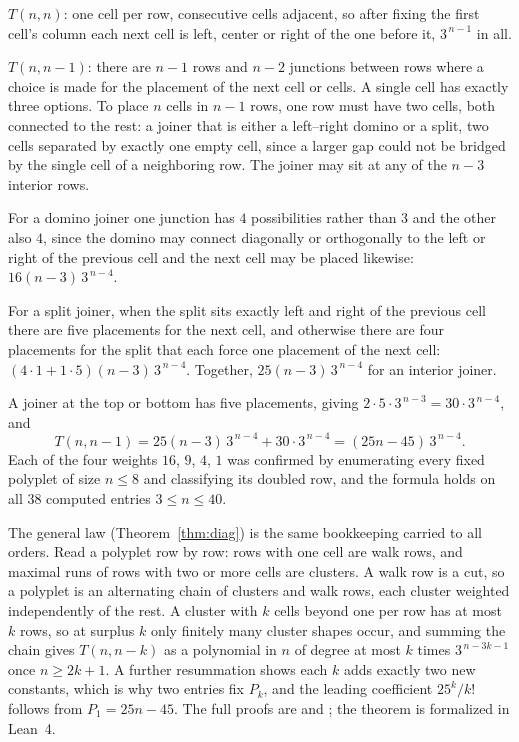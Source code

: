 \documentclass[11pt]{article}
\begin{document}
$T(n,n)$: one cell per row, consecutive cells adjacent, so after fixing the
first cell's column each next cell is left, center or right of the one
before it, $3^{\,n-1}$ in all.

$T(n,n-1)$: there are $n-1$ rows and $n-2$ junctions between rows where a
choice is made for the placement of the next cell or cells. A single cell has
exactly three options. To place $n$ cells in $n-1$ rows, one row must have
two cells, both connected to the rest: a joiner that is either a left--right
domino or a split, two cells separated by exactly one empty cell, since a
larger gap could not be bridged by the single cell of a neighboring row. The
joiner may sit at any of the $n-3$ interior rows.

For a domino joiner one
junction has $4$ possibilities rather than $3$ and the other also $4$, since
the domino may connect diagonally or orthogonally to the left or right of the
previous cell and the next cell may be placed likewise: $16(n-3)\,3^{\,n-4}$.

For a split joiner, when the split sits exactly left and right of the
previous cell there are five placements for the next cell, and otherwise
there are four placements for the split that each force one placement of the
next cell: $(4 \cdot 1 + 1 \cdot 5)(n-3)\,3^{\,n-4}$. Together, $25(n-3)\,
3^{\,n-4}$ for an interior joiner.

A joiner at the top or bottom has five placements, giving $2 \cdot 5 \cdot
3^{\,n-3} = 30 \cdot 3^{\,n-4}$, and
\[ T(n,n-1) = 25(n-3)\,3^{\,n-4} + 30 \cdot 3^{\,n-4} = (25n - 45)\,3^{\,n-4}. \]
Each of the four weights $16$, $9$, $4$, $1$ was confirmed by enumerating
every fixed polyplet of size $n \le 8$ and classifying its doubled row, and
the formula holds on all $38$ computed entries $3 \le n \le 40$.

The general law (Theorem~\ref{thm:diag}) is the same bookkeeping carried to
all orders. Read a polyplet row by row: rows with one cell are walk rows, and
maximal runs of rows with two or more cells are clusters. A walk row is a cut,
so a polyplet is an alternating chain of clusters and walk rows, each cluster
weighted independently of the rest. A cluster with $k$ cells beyond one per
row has at most $k$ rows, so at surplus $k$ only finitely many cluster shapes
occur, and summing the chain gives $T(n,n-k)$ as a polynomial in $n$ of degree
at most $k$ times $3^{\,n-3k-1}$ once $n \ge 2k+1$. A further resummation
shows each $k$ adds exactly two new constants, which is why two entries fix
$P_k$, and the leading coefficient $25^k/k!$ follows from $P_1 = 25n - 45$.
The full proofs are  and
; the theorem is formalized in Lean~4.
\end{document}
